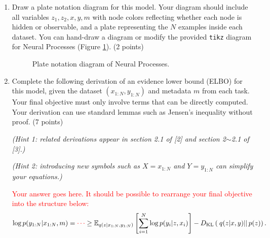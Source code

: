\documentclass[12pt]{article}
\newcommand{\kld}[2]{D_{\mathrm{KL}} \left( \left. \left. #1 \right|\right| #2 \right) }
\begin{document}
    \begin{enumerate}[label=(\alph*)]
        \item
        Draw a plate notation diagram for this model.
        Your diagram should include all variables $z_1, z_2, x, y, m$ with node colors reflecting whether each node is hidden or observable, and a plate representing the $N$ examples inside each dataset.
        You can hand-draw a diagram or modify the provided \texttt{tikz} diagram for Neural Processes (Figure \ref{fig:plate_np}).
        (2 points)
        \begin{figure}
            \centering
            \caption{ \label{fig:plate_np}
            Plate notation diagram of Neural Processes.}
        \end{figure}

        \item
        Complete the following derivation of an evidence lower bound (ELBO) for this model, given the dataset $(x_{1:N}, y_{1:N})$ and metadata $m$ from each task.
        Your final objective must only involve terms that can be directly computed.
        Your derivation can use standard lemmas such as Jensen's inequality without proof.
        (7 points)

        \textit{\small (Hint 1: related derivations appear in section 2.1 of [2] and section 2$\sim$2.1 of [3].)}

        \textit{\small (Hint 2: introducing new symbols such as $X=x_{1:N}$ and $Y=y_{1:N}$ can simplify your equations.)}

        \textcolor{red}{Your answer goes here. It should be possible to rearrange your final objective into the structure below:}
        \begin{align}
            \log p(y_{1:N} | x_{1:N}, m)
            = \textcolor{red}{\cdots}
            \geq \mathbb{E}_{
                q(z|x_{1:N},y_{1:N})
            }
            \left[
                \sum_{i=1}^{N}\log p(y_{i}|z,x_{i})
                \right]
            -\kld{q(z|x,y)}{p(z)}.
        \end{align}
    \end{enumerate}
\end{document}
